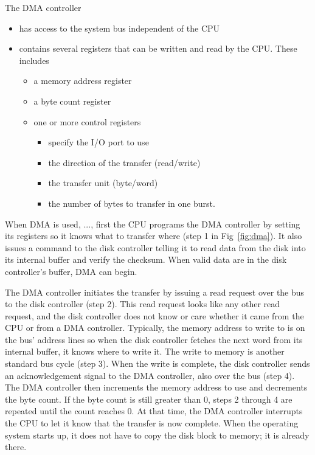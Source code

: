 \begin{frame}%
  \begin{block}{The DMA controller}
    \begin{itemize}
    \item has access to the system bus independent of the CPU
    \item contains several registers that can be written and read by the CPU. These
      includes
      \begin{itemize}
      \item a memory address register
      \item a byte count register
      \item one or more control registers
        \begin{itemize}
        \item specify the I/O port to use
        \item the direction of the transfer (read/write)
        \item the transfer unit (byte/word)
        \item the number of bytes to transfer in one burst.
        \end{itemize}
      \end{itemize}
    \end{itemize}
  \end{block}
\end{frame}

\begin{frame}%
  \label{fig:dma}
  \centering \mode<beamer>{
    \texttt{[image: dma]}
  } 
\end{frame}

When DMA is used, ..., first the CPU programs the DMA controller by setting its registers
so it knows what to transfer where (step 1 in Fig~\ref{fig:dma}). It also issues a command
to the disk controller telling it to read data from the disk into its internal buffer and
verify the checksum. When valid data are in the disk controller's buffer, DMA can
begin.

The DMA controller initiates the transfer by issuing a read request over the bus to the
disk controller (step 2). This read request looks like any other read request, and the
disk controller does not know or care whether it came from the CPU or from a DMA
controller. Typically, the memory address to write to is on the bus' address lines so when
the disk controller fetches the next word from its internal buffer, it knows where to
write it. The write to memory is another standard bus cycle (step 3). When the write is
complete, the disk controller sends an acknowledgement signal to the DMA controller, also
over the bus (step 4). The DMA controller then increments the memory address to use and
decrements the byte count. If the byte count is still greater than 0, steps 2 through 4
are repeated until the count reaches 0. At that time, the DMA controller interrupts the
CPU to let it know that the transfer is now complete. When the operating system starts up,
it does not have to copy the disk block to memory; it is already there.


